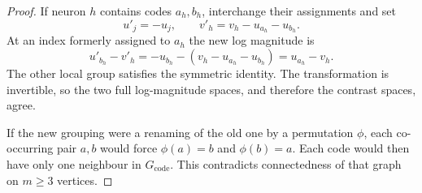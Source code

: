 \begin{proof}
    If neuron $h$ contains codes $a_h,b_h$, interchange their
    assignments and set
    $$
        u'_j=-u_j,\qquad v'_h=v_h-u_{a_h}-u_{b_h}.
    $$
    At an index formerly assigned to $a_h$ the new log magnitude is
    $$
        u'_{b_h}-v'_h
          =-u_{b_h}-(v_h-u_{a_h}-u_{b_h})
          =u_{a_h}-v_h.
    $$
    The other local group satisfies the symmetric identity.
    The transformation is invertible, so the two full log-magnitude
    spaces, and therefore the contrast spaces, agree.

    If the new grouping were a renaming of the old one by a
    permutation $\phi$, each co-occurring pair $a,b$ would force
    $\phi(a)=b$ and $\phi(b)=a$.
    Each code would then have only one neighbour in
    $G_{\mathrm{code}}$. This contradicts connectedness of that graph
    on $m\ge3$ vertices.
\end{proof}

